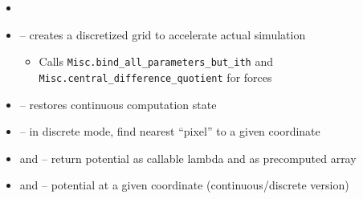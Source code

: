 \begin{frame}[fragile]
%
\begin{defbox}
\begin{itemize}
\item {}
\item {} -- creates a discretized grid to accelerate actual simulation
	\begin{itemize}
	\item Calls \texttt{Misc.bind\_all\_parameters\_but\_ith} and \texttt{Misc.central\_difference\_quotient} for forces
	\end{itemize}
\item {} -- restores continuous computation state
\item {} -- in discrete mode, find nearest \enquote{pixel} to a given coordinate
\item {} and  -- return potential as callable lambda and as precomputed array
\item {} and  -- potential at a given coordinate (continuous/discrete version)
\end{itemize}
\end{defbox}
%
\end{frame}


